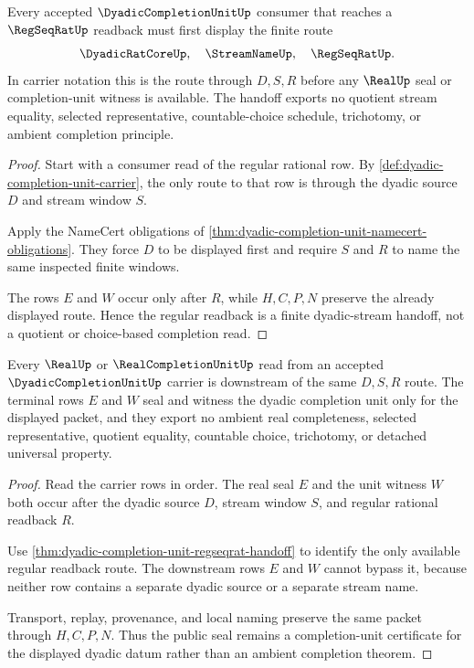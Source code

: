 \begin{theorem}
\label{thm:dyadic-completion-unit-regseqrat-handoff}
Every accepted $\DyadicCompletionUnitUp$ consumer that reaches a $\RegSeqRatUp$ readback must first display the finite route
$$
\DyadicRatCoreUp,\quad \StreamNameUp,\quad \RegSeqRatUp .
$$
In carrier notation this is the route through $D,S,R$ before any $\RealUp$ seal or completion-unit witness is available. The handoff exports no quotient stream equality, selected representative, countable-choice schedule, trichotomy, or ambient completion principle.
\end{theorem}
\begin{proof}
Start with a consumer read of the regular rational row. By \autoref{def:dyadic-completion-unit-carrier}, the only route to that row is through the dyadic source $D$ and stream window $S$.

Apply the NameCert obligations of \autoref{thm:dyadic-completion-unit-namecert-obligations}. They force $D$ to be displayed first and require $S$ and $R$ to name the same inspected finite windows.

The rows $E$ and $W$ occur only after $R$, while $H,C,P,N$ preserve the already displayed route. Hence the regular readback is a finite dyadic-stream handoff, not a quotient or choice-based completion read.
\end{proof}

\begin{theorem}
\label{thm:dyadic-completion-unit-real-seal-nonescape}
Every $\RealUp$ or $\RealCompletionUnitUp$ read from an accepted $\DyadicCompletionUnitUp$ carrier is downstream of the same $D,S,R$ route. The terminal rows $E$ and $W$ seal and witness the dyadic completion unit only for the displayed packet, and they export no ambient real completeness, selected representative, quotient equality, countable choice, trichotomy, or detached universal property.
\end{theorem}
\begin{proof}
Read the carrier rows in order. The real seal $E$ and the unit witness $W$ both occur after the dyadic source $D$, stream window $S$, and regular rational readback $R$.

Use \autoref{thm:dyadic-completion-unit-regseqrat-handoff} to identify the only available regular readback route. The downstream rows $E$ and $W$ cannot bypass it, because neither row contains a separate dyadic source or a separate stream name.

Transport, replay, provenance, and local naming preserve the same packet through $H,C,P,N$. Thus the public seal remains a completion-unit certificate for the displayed dyadic datum rather than an ambient completion theorem.
\end{proof}


